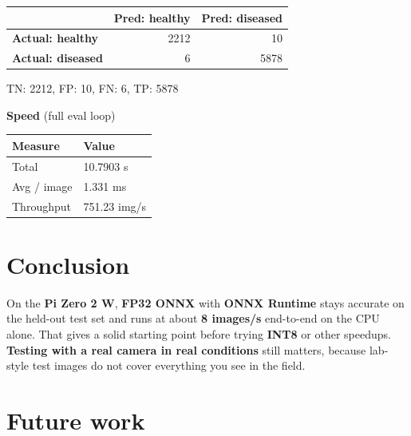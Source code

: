 \documentclass[a4paper,onesided,12pt]{report}
\begin{document}
\begin{table}[h!]
\begin{center}
\begin{tabular}{|l|r|r|}
\hline
 & \textbf{Pred: healthy} & \textbf{Pred: diseased} \\
\hline
\textbf{Actual: healthy} & 2212 & 10 \\
\hline
\textbf{Actual: diseased} & 6 & 5878 \\
\hline
\end{tabular}
\end{center}
\end{table}

TN: 2212, FP: 10, FN: 6, TP: 5878

\textbf{Speed} (full eval loop)

\begin{table}[h!]
\begin{center}
\begin{tabular}{|l|l|}
\hline
\textbf{Measure} & \textbf{Value} \\
\hline
Total & 10.7903 s \\
\hline
Avg / image & 1.331 ms \\
\hline
Throughput & 751.23 img/s \\
\hline
\end{tabular}
\end{center}
\end{table}

\chapter{Conclusion}

On the \textbf{Pi Zero 2 W}, \textbf{FP32 ONNX} with \textbf{ONNX Runtime} stays accurate on the held-out test set and runs at about \textbf{8 images/s} end-to-end on the CPU alone. That gives a solid starting point before trying \textbf{INT8} or other speedups. \textbf{Testing with a real camera in real conditions} still matters, because lab-style test images do not cover everything you see in the field.

\chapter{Future work}
\end{document}
